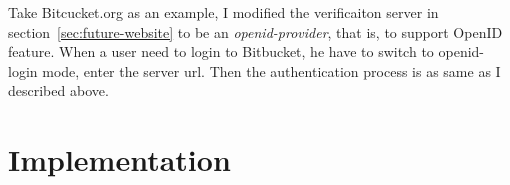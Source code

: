 \begin{CJK}{Bg5}{bsmi}
Take Bitcucket.org as an example, I modified the verificaiton server in section~\ref{sec:future-website} to be an \emph{openid-provider}, that is, to support OpenID feature. When a user need to login to Bitbucket, he have to switch to openid-login mode, enter the server url. Then the authentication process is as same as I described above. 

\section{Implementation}

\end{CJK}